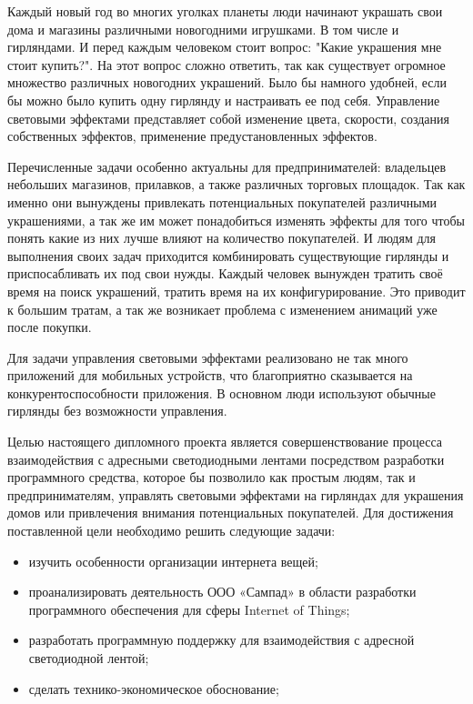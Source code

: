 \label{sec:introduction}

Каждый новый год во многих уголках планеты люди начинают украшать свои дома и магазины различными новогодними игрушками. В том числе и гирляндами. И перед каждым человеком стоит вопрос: "Какие украшения мне стоит купить?". На этот вопрос сложно ответить, так как существует огромное множество различных новогодних украшений. Было бы намного удобней, если бы можно было купить одну гирлянду и настраивать ее под себя. Управление световыми эффектами представляет собой изменение цвета, скорости, создания собственных эффектов, применение предустановленных эффектов.

Перечисленные задачи особенно актуальны для предпринимателей: владельцев небольших магазинов, прилавков, а также различных торговых площадок. Так как именно они вынуждены привлекать потенциальных покупателей различными украшениями, а так же им может понадобиться изменять эффекты для того чтобы понять какие из них лучше влияют на количество покупателей. И людям для выполнения своих задач приходится комбинировать существующие гирлянды и приспосабливать их под свои нужды. Каждый человек вынужден тратить своё время на поиск украшений, тратить время на их конфигурирование. Это приводит к большим тратам, а так же возникает проблема с изменением анимаций уже после покупки.

Для задачи управления световыми эффектами реализовано не так много приложений для мобильных устройств, что благоприятно сказывается на конкурентоспособности приложения. В основном люди используют обычные гирлянды без возможности управления.

Целью настоящего дипломного проекта является совершенствование процесса взаимодействия с адресными светодиодными лентами посредством разработки программного средства, которое бы позволило как простым людям, так и предпринимателям, управлять световыми эффектами на гирляндах для украшения домов или привлечения внимания потенциальных покупателей. Для достижения поставленной цели необходимо решить следующие задачи:
\begin{itemize}
\item изучить особенности организации интернета вещей;
\item проанализировать деятельность ООО «Сампад» в области разработки программного обеспечения для сферы Internet of Things;
\item разработать программную поддержку для взаимодействия с адресной светодиодной лентой;
\item сделать технико-экономическое обоснование;
\end{itemize}